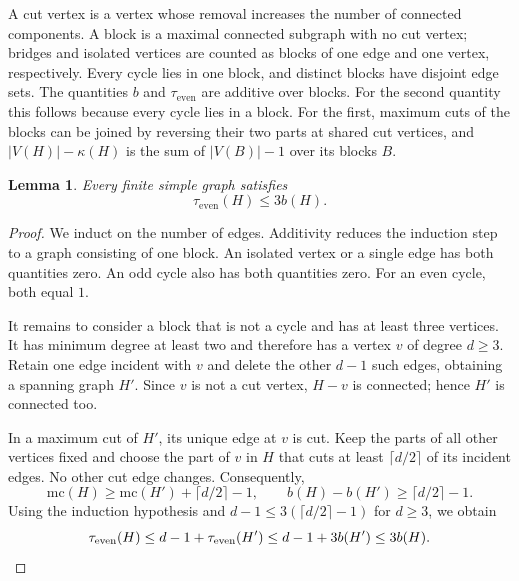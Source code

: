 \documentclass[11pt]{article}
\numberwithin{equation}{section}
\newtheorem{lemma}[theorem]{Lemma}
\theoremstyle{remark}
\begin{document}
A cut vertex is a vertex whose removal increases the number of connected components. A block is a maximal connected subgraph with no cut vertex; bridges and isolated vertices are counted as blocks of one edge and one vertex, respectively. Every cycle lies in one block, and distinct blocks have disjoint edge sets. The quantities $b$ and $\tau_{\mathrm{even}}$ are additive over blocks. For the second quantity this follows because every cycle lies in a block. For the first, maximum cuts of the blocks can be joined by reversing their two parts at shared cut vertices, and $|V(H)|-\kappa(H)$ is the sum of $|V(B)|-1$ over its blocks $B$.

\begin{lemma}\label{lem:tau}
Every finite simple graph satisfies
\[
\tau_{\mathrm{even}}(H)\le3b(H).
\]
\end{lemma}

\begin{proof}
We induct on the number of edges. Additivity reduces the induction step to a graph consisting of one block. An isolated vertex or a single edge has both quantities zero. An odd cycle also has both quantities zero. For an even cycle, both equal $1$.

It remains to consider a block that is not a cycle and has at least three vertices. It has minimum degree at least two and therefore has a vertex $v$ of degree $d\ge3$. Retain one edge incident with $v$ and delete the other $d-1$ such edges, obtaining a spanning graph $H'$. Since $v$ is not a cut vertex, $H-v$ is connected; hence $H'$ is connected too.

In a maximum cut of $H'$, its unique edge at $v$ is cut. Keep the parts of all other vertices fixed and choose the part of $v$ in $H$ that cuts at least $\lceil d/2\rceil$ of its incident edges. No other cut edge changes. Consequently,
\[
\mathrm{mc}(H)\ge\mathrm{mc}(H')+\lceil d/2\rceil-1,\qquad b(H)-b(H')\ge\lceil d/2\rceil-1.
\]
Using the induction hypothesis and $d-1\le3(\lceil d/2\rceil-1)$ for $d\ge3$, we obtain
\[
\tau_{\mathrm{even}}(H)\le d-1+\tau_{\mathrm{even}}(H')\le d-1+3b(H')\le3b(H).\qedhere
\]
\end{proof}
\end{document}
